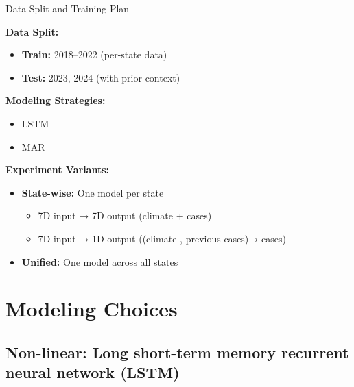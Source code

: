 \documentclass{beamer}
\begin{document}
\begin{frame}{Data Split and Training Plan}

\textbf{Data Split:}
\begin{itemize}
    \item \textbf{Train:} 2018–2022 (per-state data)
    \item \textbf{Test:} 2023, 2024 (with prior context)
\end{itemize}

\vspace{0.5em}
\textbf{Modeling Strategies:}
\begin{itemize}
    \item LSTM
    \item MAR
\end{itemize}

\vspace{0.5em}
\textbf{Experiment Variants:}
\begin{itemize}
    \item \textbf{State-wise:} One model per state
    \begin{itemize}
        \item 7D input → 7D output (climate + cases)
        \item 7D input → 1D output ((climate , previous cases)→ cases)
    \end{itemize}
    \item \textbf{Unified:} One model across all states
\end{itemize}

\end{frame}



\section{Modeling Choices}

\subsection{Non-linear: Long short-term memory recurrent neural network (LSTM)}
\end{document}
